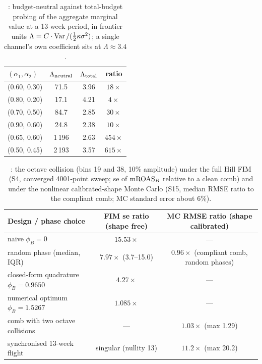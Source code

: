 \begin{table}[htbp]
\centering\small
\caption{: budget-neutral against total-budget probing of the aggregate marginal value at a 13-week period, in frontier units $\Lambda = C\cdot\operatorname{Var}/(\tfrac12\kappa\sigma^2)$; a single channel's own coefficient sits at $\Lambda \approx 3.4$.}
\label{ident:tab:lambda}
\begin{tabular}{lccc}
\toprule
$(\alpha_1, \alpha_2)$ & $\Lambda_{\rm neutral}$ & $\Lambda_{\rm total}$ & ratio \\
\midrule
(0.60, 0.30) & 71.5 & 3.96 & $18\times$ \\
(0.80, 0.20) & 17.1 & 4.21 & $4\times$ \\
(0.70, 0.50) & 84.7 & 2.85 & $30\times$ \\
(0.90, 0.60) & 24.8 & 2.38 & $10\times$ \\
(0.65, 0.60) & 1\,196 & 2.63 & $454\times$ \\
(0.50, 0.45) & 2\,193 & 3.57 & $615\times$ \\
\bottomrule
\end{tabular}
\end{table}

\begin{table}[htbp]
\centering\small
\caption{: the octave collision (bins 19 and 38, 10\% amplitude) under the full Hill FIM (S4, converged 4001-point sweep; se of $\mathrm{mROAS}_B$ relative to a clean comb) and under the nonlinear calibrated-shape Monte Carlo (S15, median RMSE ratio to the compliant comb; MC standard error about 6\%).}
\label{ident:tab:collision}
\begin{tabular}{lcc}
\toprule
Design / phase choice & FIM se ratio (shape free) & MC RMSE ratio (shape calibrated) \\
\midrule
naive $\phi_B = 0$ & $15.53\times$ & --- \\
random phase (median, IQR) & $7.97\times$ (3.7--15.0) & $0.96\times$ (compliant comb, random phases) \\
closed-form quadrature $\phi_B = 0.9650$ & $4.27\times$ & --- \\
numerical optimum $\phi_B = 1.5267$ & $1.085\times$ & --- \\
comb with two octave collisions & --- & $1.03\times$ (max 1.29) \\
synchronised 13-week flight & singular (nullity 13) & $11.2\times$ (max 20.2) \\
\bottomrule
\end{tabular}
\end{table}

